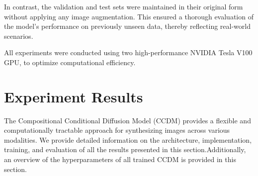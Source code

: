 In contrast, the validation and test sets were maintained in their original form without applying any image augmentation. This ensured a thorough evaluation of the model's performance on previously unseen data, thereby reflecting real-world scenarios.

All experiments were conducted using two high-performance NVIDIA Tesla V100 GPU, to optimize computational efficiency. 
\newpage
\section{Experiment Results}
The Compositional Conditional Diffusion Model (CCDM) provides a flexible and computationally tractable approach for synthesizing images across various modalities. We provide detailed information on the architecture, implementation, training, and evaluation of all the results presented in this section.Additionally, an overview of the hyperparameters of all trained CCDM is provided in this section.

